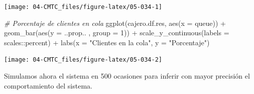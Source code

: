 \documentclass[
]{book}
\newenvironment{Shaded}{\begin{snugshade}}{\end{snugshade}}
\newcommand{\AttributeTok}[1]{\textcolor[rgb]{0.77,0.63,0.00}{#1}}
\newcommand{\CommentTok}[1]{\textcolor[rgb]{0.56,0.35,0.01}{\textit{#1}}}
\newcommand{\DecValTok}[1]{\textcolor[rgb]{0.00,0.00,0.81}{#1}}
\newcommand{\FunctionTok}[1]{\textcolor[rgb]{0.00,0.00,0.00}{#1}}
\newcommand{\NormalTok}[1]{#1}
\newcommand{\SpecialCharTok}[1]{\textcolor[rgb]{0.00,0.00,0.00}{#1}}
\newcommand{\StringTok}[1]{\textcolor[rgb]{0.31,0.60,0.02}{#1}}
\theoremstyle{definition}
\theoremstyle{definition}
\theoremstyle{definition}
\theoremstyle{definition}
\theoremstyle{remark}
\begin{document}
\begin{center}\texttt{[image: 04-CMTC\_files/figure-latex/05-034-1]} \end{center}

\begin{Shaded}
\begin{Highlighting}[]
\CommentTok{\# Porcentaje de clientes en cola}
\FunctionTok{ggplot}\NormalTok{(cajero.df.res, }\FunctionTok{aes}\NormalTok{(}\AttributeTok{x =}\NormalTok{ queue)) }\SpecialCharTok{+} 
  \FunctionTok{geom\_bar}\NormalTok{(}\FunctionTok{aes}\NormalTok{(}\AttributeTok{y =}\NormalTok{ ..prop.. , }\AttributeTok{group =} \DecValTok{1}\NormalTok{)) }\SpecialCharTok{+} 
  \FunctionTok{scale\_y\_continuous}\NormalTok{(}\AttributeTok{labels =}\NormalTok{ scales}\SpecialCharTok{::}\NormalTok{percent) }\SpecialCharTok{+} 
  \FunctionTok{labs}\NormalTok{(}\AttributeTok{x =} \StringTok{"Clientes en la cola"}\NormalTok{, }\AttributeTok{y =} \StringTok{"Porcentaje"}\NormalTok{)}
\end{Highlighting}
\end{Shaded}

\begin{center}\texttt{[image: 04-CMTC\_files/figure-latex/05-034-2]} \end{center}

Simulamos ahora el sistema en 500 ocasiones para inferir con mayor precisión el comportamiento del sistema.
\end{document}

